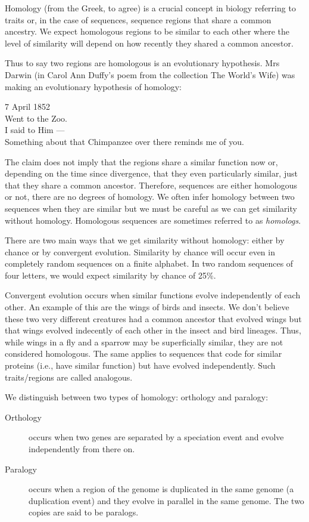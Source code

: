 \documentclass[11pt]{article}
\begin{document}
Homology (from the Greek, to agree) is a crucial concept in biology referring to traits or, in the case of sequences,  sequence regions  that share a common ancestry.  We expect homologous regions to be similar to each other where the level of similarity will depend on how recently they shared a common ancestor.

Thus to say two regions are homologous is an evolutionary hypothesis.  Mrs Darwin (in Carol Ann Duffy's poem from the collection The World's Wife) was making an evolutionary hypothesis of homology:

7 April 1852 \\
Went to the Zoo.\\
I said to Him --- \\
Something about that Chimpanzee over there reminds me of you.

The claim does not imply that the regions share a similar function now or, depending on the time since divergence, that they  even particularly similar, just that they share a common ancestor.  Therefore, sequences are either homologous or not, there are no degrees of homology. We often infer homology between two sequences when they are similar but we must be careful as we can get similarity without homology.  Homologous sequences are sometimes referred to as {\em homologs}.

There are two main ways that we get similarity without homology: either by chance or by convergent evolution.  Similarity by chance will occur even in completely random sequences on a finite alphabet.  In two random sequences of four letters, we would expect similarity by chance of 25\%.  

Convergent evolution occurs when similar functions evolve independently of each other.  An example of this are the wings of birds and insects.  We don't believe these two very different creatures had a common ancestor that evolved wings but that wings evolved indecently of each other in the insect and bird lineages.  Thus, while wings in a fly and a sparrow may be superficially similar, they are not considered homologous.  The same applies to sequences that code for similar proteins (i.e., have similar function) but have evolved independently.  Such traits/regions are called analogous.

We distinguish between two types of homology: orthology and paralogy:
\begin{description}
\item[Orthology] occurs when two genes are separated by a speciation event and evolve independently from there on.   
\item[Paralogy] occurs when a region of the genome is duplicated in the same genome (a duplication event) and they evolve in parallel in the same genome.  The two copies are said to be paralogs.
\end{description}
\end{document}
